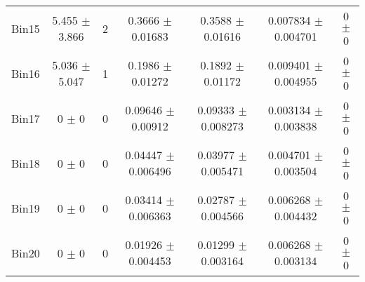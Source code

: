 \begin{tabular}{@{\extracolsep{4pt}}lcccccc@{}}
     Bin15 & 5.455 $\pm$ 3.866 & 2 & 0.3666 $\pm$ 0.01683 & 0.3588 $\pm$ 0.01616 & 0.007834 $\pm$ 0.004701 & 0 $\pm$ 0 \\ 
     Bin16 & 5.036 $\pm$ 5.047 & 1 & 0.1986 $\pm$ 0.01272 & 0.1892 $\pm$ 0.01172 & 0.009401 $\pm$ 0.004955 & 0 $\pm$ 0 \\ 
     Bin17 & 0 $\pm$ 0 & 0 & 0.09646 $\pm$ 0.00912 & 0.09333 $\pm$ 0.008273 & 0.003134 $\pm$ 0.003838 & 0 $\pm$ 0 \\ 
     Bin18 & 0 $\pm$ 0 & 0 & 0.04447 $\pm$ 0.006496 & 0.03977 $\pm$ 0.005471 & 0.004701 $\pm$ 0.003504 & 0 $\pm$ 0 \\ 
     Bin19 & 0 $\pm$ 0 & 0 & 0.03414 $\pm$ 0.006363 & 0.02787 $\pm$ 0.004566 & 0.006268 $\pm$ 0.004432 & 0 $\pm$ 0 \\ 
     Bin20 & 0 $\pm$ 0 & 0 & 0.01926 $\pm$ 0.004453 & 0.01299 $\pm$ 0.003164 & 0.006268 $\pm$ 0.003134 & 0 $\pm$ 0 \\ 
\hline\hline
  \end{tabular}
